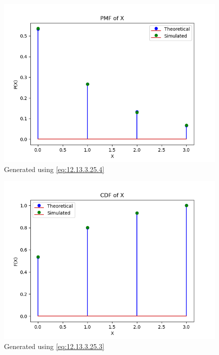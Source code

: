 \documentclass[journal,12pt,twocolumn]{IEEEtran}
\theoremstyle{remark}
\begin{document}
\begin{figure}
	\centering
	\includegraphics[width=\columnwidth]{exemplar/12/13/3/25/figs/pmf.png}
	\caption{Generated using \eqref{eq:12.13.3.25.4}}
\end{figure}
\begin{figure}
	\centering
	\includegraphics[width=\columnwidth]{exemplar/12/13/3/25/figs/cdf.png}
	\caption{Generated using \eqref{eq:12.13.3.25.3}}
\end{figure}
\end{document}
